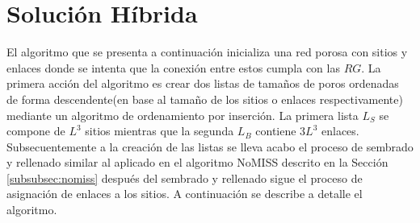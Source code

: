 \section{Solución Híbrida}
\label{sec:hybrid}
El algoritmo que se presenta a continuación inicializa una red porosa con sitios y enlaces donde se intenta que la conexi\'on entre estos cumpla con las $RG$. La primera acción del algoritmo es crear dos listas de tamaños de poros ordenadas de forma descendente(en base al tamaño de los sitios o enlaces respectivamente) mediante un algoritmo de ordenamiento por inserción. La primera lista $L_S$ se compone de $L^3$ sitios mientras que la segunda $L_B$ contiene $3L^3$ enlaces. Subsecuentemente a la creaci\'on de  las listas se lleva acabo el proceso de sembrado y rellenado similar al aplicado en el algoritmo NoMISS descrito en la Sección \ref{subsubsec:nomiss} después del sembrado y rellenado sigue el proceso de asignación de enlaces a los sitios. A continuación se describe a detalle el algoritmo.



